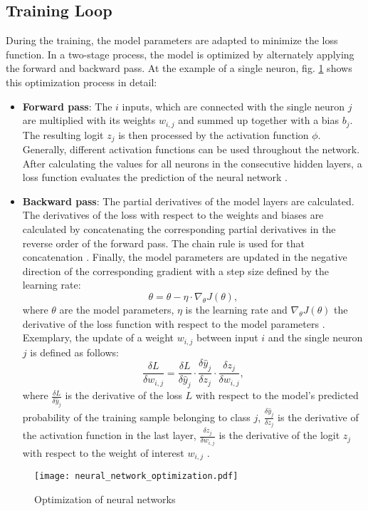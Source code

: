\subsection{Training Loop}
During the training, the model parameters are adapted to minimize the loss function. In a two-stage process, the model is optimized by alternately applying the forward and backward pass. At the example of a single neuron, fig. \ref{fig:neural_network_optimization} shows this optimization process in detail: 
\begin{itemize}
    \item \textbf{Forward pass}: The $i$ inputs, which are connected with the single neuron $j$ are multiplied with its weights $w_{i,j}$ and summed up together with a bias $b_{j}$. The resulting logit $z_{j}$ is then processed by the activation function $\phi$. Generally, different activation functions can be used throughout the network. After calculating the values for all neurons in the consecutive hidden layers, a loss function evaluates the prediction of the neural network \cite{AN201942}.
    \item \textbf{Backward pass}: 
    The partial derivatives of the model layers are calculated. The derivatives of the loss with respect to the weights and biases are calculated by concatenating the corresponding partial derivatives in the reverse order of the forward pass. The chain rule is used for that concatenation \cite{ShilohPerl2020}. Finally, the model parameters are updated in the negative direction of the corresponding gradient with a step size defined by the learning rate:
    \begin{equation}
        \theta = \theta - \eta \cdot {\nabla}_{\theta}J(\theta),
    \end{equation}
    where $\theta$ are the model parameters, $\eta$ is the learning rate and ${\nabla}_{\theta}J(\theta)$ the derivative of the loss function with respect to the model parameters \cite{Lydia2019}. Exemplary, the update of a weight $w_{i,j}$ between input $i$ and the single neuron $j$ is defined as follows:
    \begin{equation}
     \frac{\delta L}{\delta w_{i,j}} = \frac{\delta L}{\delta \hat{y}_{j}} \cdot \frac{\delta \hat{y}_{j}}{\delta z_{j}} \cdot \frac{\delta z_{j}}{\delta w_{i,j}}, 
     \label{chain_rule}
    \end{equation}
where $\frac{\delta L}{\delta \hat{y}_{j}}$ is the derivative of the loss $L$ with respect to the model's predicted probability of the training sample belonging to class $j$, $\frac{\delta \hat{y}_{j}}{\delta z_{j}}$ is the derivative of the activation function in the last layer, $ \frac{\delta z_{j}}{\delta w_{i,j}}$ is the derivative of the logit $z_{j}$ with respect to the weight of interest $w_{i,j}$ \cite{ShilohPerl2020}. 
\end{itemize}
\begin{figure}[H]
  \centering
  \texttt{[image: neural\_network\_optimization.pdf]}
  \caption {Optimization of neural networks}
  \label{fig:neural_network_optimization}
\end{figure}

